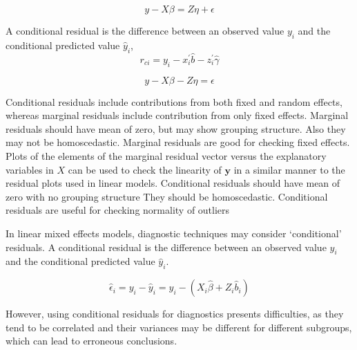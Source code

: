 \documentclass[12pt, a4paper]{report}
\theoremstyle{plain}
\theoremstyle{definition}
\theoremstyle{remark}
\begin{document}
	\[y - X\beta = Z \eta +\epsilon \]
	
	A conditional residual is the difference between an observed value $y_{i}$ and the conditional predicted value $\hat{y}_{i} $,
	\[r_{ci} = y_i - x_i^{\prime} \hat{b} - z_i^{\prime} \hat{\gamma}\]
	
	\[y - X\beta - Z \eta = \epsilon \]
	
	Conditional residuals include contributions from both fixed and random effects, whereas marginal residuals include contribution from only fixed effects. Marginal residuals should have mean of zero, but may show grouping structure. 
	Also they may not be homoscedastic. Marginal residuals are good for checking fixed effects.	Plots of the elements of the marginal residual vector versus the explanatory variables in $X$ can be used to check the linearity of $\boldsymbol{y}$ in a similar manner to the residual plots used in linear models.
	Conditional residuals should have mean of zero with no grouping structure
	They should be homoscedastic. Conditional residuals are useful for checking normality of outliers
	
	
	In linear mixed effects models, diagnostic techniques may consider `conditional' residuals. A conditional residual is the difference between an observed value $y_{i}$ and the conditional predicted value $\hat{y}_{i} $.
	
	\[ \hat{\epsilon}_{i} = y_{i} - \hat{y}_{i} = y_{i} - ( X_{i}\hat{\beta} + Z_{i}\hat{b}_{i}) \]
	
	However, using conditional residuals for diagnostics presents difficulties, as they tend to be correlated and their variances may be different for different subgroups, which can lead to erroneous conclusions.
	
	
	
	
	
\end{document}
